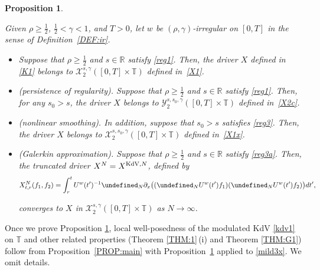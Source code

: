 \documentclass[letterpaper, 11pt,  reqno]{amsart}
\newtheorem{proposition}[theorem]{Proposition}
\newcommand{\1}{\hspace{0.5mm}\text{I}\hspace{0.5mm}}
\newcommand{\noi}{\noindent}
\newcommand{\R}{\mathbb{R}}
\newcommand{\T}{\mathbb{T}}
\let\P= \undefined
\newcommand{\P}{\mathbf{P}}
\newcommand{\g}{\gamma}
\newcommand{\cX}{\mathcal{X}}
\newcommand{\cY}{\mathcal{Y}}
\newcommand{\uw}{U^w}
\newcommand{\KDV}{\text{\rm KdV} }
\numberwithin{equation}{section}
\numberwithin{theorem}{section}
\begin{document}
\begin{proposition}
\label{PROP:kdv1}


Given $\rho \ge\frac 12$, $\frac 12 < \g < 1$, and $T> 0$, 
let  $w$ be $(\rho,\g)$-irregular on $[0, T]$ in the sense of Definition~\ref{DEF:ir}.

\smallskip

\begin{itemize}
\item[(i)]
Suppose that $\rho \ge \frac 12$ and $s \in \R$
satisfy 
\eqref{reg1}.
Then, 
the driver $X$ defined in \eqref{K1}
belongs to $ \cX^{s, \g}_2([0, T]\times \T)$
defined in~\eqref{X1}.

\smallskip
\item[(ii)] \textup{(persistence of regularity).}
Suppose that $\rho \ge \frac 12$ and $s \in \R$
satisfy 
\eqref{reg1}.
Then, 
for any $s_0 > s$, 
the driver $X$ 
belongs to 
$\cY^{s, s_0, \g}_{2}([0, T]\times \T)$
defined in~\eqref{X2c}.



\smallskip
\item[(iii)]
\textup{(nonlinear smoothing).}
In addition, suppose that $s_0 > s$ satisfies
\eqref{reg3}.
Then, 
the driver $X$ 
belongs to 
$\cX^{s, s_0, \g}_{2}([0, T]\times \T)$
defined in~\eqref{X1x}.



\smallskip
\item[(iv)]
\textup{(Galerkin approximation).}
Suppose that $\rho \ge \frac 12$ and $s \in \R$
satisfy 
\eqref{reg3a}.
Then, 
the truncated driver $X^N = X^{\KDV,  N}$, defined by 
\begin{align}
X_{t,r}^N(f_1,f_2)=\int_r^t \uw(t')^{-1} \P_N \partial_x\big(
( \P_N \uw(t')  f_1 )(\P_N \uw(t') f_2 )\big) dt', 
\label{XN}
\end{align}

\noi
 converges
to  $X$ 
in  $ \cX^{s, \g}_2([0, T]\times \T)$ as $N \to \infty$.


\end{itemize}




 \end{proposition}



Once we prove Proposition \ref{PROP:kdv1}, 
local well-posedness of the modulated KdV \eqref{kdv1}
on $\T$
and other related properties
(Theorem \ref{THM:1}\,(i) and Theorem \ref{THM:G1}) follow
from Proposition~\ref{PROP:main}
with Proposition~\ref{PROP:kdv1}
applied to \eqref{mild3x}.
We omit details.
\end{document}
